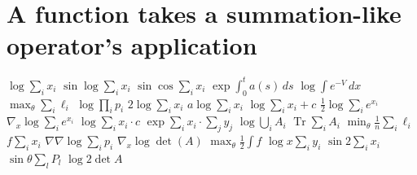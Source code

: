 \documentclass{article}
\begin{document}
\section{A function takes a summation-like operator's application}
$\log\sum_i x_i$ $\sin\log\sum_i x_i$ $\sin\cos\sum_i x_i$ $\exp\int_0^t a(s)\,ds$ $\log\int e^{-V}\,dx$ $\max_\theta\sum_i\ell_i$
$\log\prod_i p_i$ $2\log\sum_i x_i$ $a\log\sum_i x_i$ $\log\sum_i x_i+c$ $\frac12\log\sum_i e^{x_i}$ $\nabla_x\log\sum_i e^{x_i}$
$\log\sum_i x_i\cdot c$ $\exp\sum_i x_i\cdot\sum_j y_j$ $\log\bigcup_i A_i$ $\operatorname{Tr}\sum_i A_i$ $\min_{\theta}\frac{1}{n}\sum_{i}\ell_{i}$ $f\sum_i x_i$
$\nabla\nabla\log\sum_i p_i$ $\nabla_x\log\det(A)$ $\max_\theta\frac12\int f$ $\log x\sum_i y_i$ $\sin 2\sum_i x_i$ $\sin\theta\sum_l P_l$ $\log 2\det A$
\end{document}
